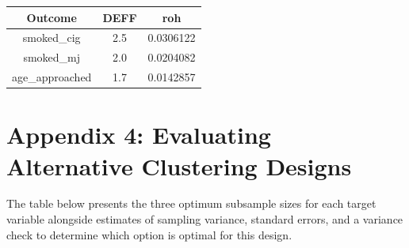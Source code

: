 \documentclass[
  12pt]{article}
\begin{document}
\begin{longtable}[]{@{}ccc@{}}
\toprule\noalign{}
Outcome & DEFF & roh \\
\midrule\noalign{}
\endhead
\bottomrule\noalign{}
\endlastfoot
smoked\_cig & 2.5 & 0.0306122 \\
smoked\_mj & 2.0 & 0.0204082 \\
age\_approached & 1.7 & 0.0142857 \\
\end{longtable}

\newpage

\section{Appendix 4: Evaluating Alternative Clustering
Designs}\label{appendix-4-evaluating-alternative-clustering-designs}

The table below presents the three optimum subsample sizes for each
target variable alongside estimates of sampling variance, standard
errors, and a variance check to determine which option is optimal for
this design.
\end{document}
